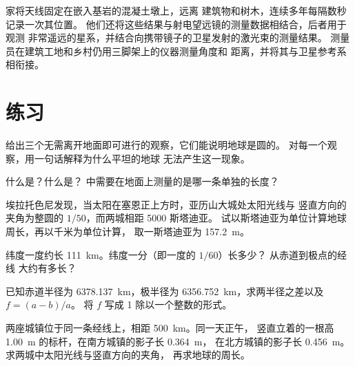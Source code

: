 \begin{inthefield}[今日的地面测量]
家将天线固定在嵌入基岩的混凝土墩上，远离
建筑物和树木，连续多年每隔数秒记录一次其位置。
他们还将这些结果与射电望远镜的测量数据相结合，后者用于观测
非常遥远的星系，并结合向携带镜子的卫星发射的激光束的测量结果。
测量员在建筑工地和乡村仍用三脚架上的仪器测量角度和
距离，并将其与卫星参考系相衔接。
\end{inthefield}

\section{练习}

\begin{exercise}[$\star$]\label{exo:g10:measuring-the-earth:1}
给出三个无需离开地面即可进行的观察，它们能说明地球是圆的。
对每一个观察，用一句话解释为什么平坦的地球
无法产生这一现象。
\end{exercise}

\begin{exercise}[$\star$]\label{exo:g10:measuring-the-earth:2}
什么是？什么是？
中需要在地面上测量的是哪一条单独的长度？
\end{exercise}

\begin{exercise}[$\star$]\label{exo:g10:measuring-the-earth:3}
埃拉托色尼发现，当太阳在塞恩正上方时，亚历山大城处太阳光线与
竖直方向的夹角为整圆的 $1/50$，而两城相距 5000 斯塔迪亚。
试以斯塔迪亚为单位计算地球周长，再以千米为单位计算，
取一斯塔迪亚为 \qty{157.2}{m}。
\end{exercise}

\begin{exercise}[$\star$]\label{exo:g10:measuring-the-earth:4}
纬度一度约长 \qty{111}{km}。纬度一分（即一度的 $1/60$）长多少？
从赤道到极点的经线
大约有多长？
\end{exercise}

\begin{exercise}[$\star$]\label{exo:g10:measuring-the-earth:5}
已知赤道半径为 \qty{6378.137}{km}，极半径为
\qty{6356.752}{km}，求两半径之差以及 $f = (a-b)/a$。
将 $f$ 写成 1 除以一个整数的形式。
\end{exercise}

\begin{exercise}[$\star\star$]\label{exo:g10:measuring-the-earth:6}
两座城镇位于同一条经线上，相距 \qty{500}{km}。同一天正午，
竖直立着的一根高 \qty{1.00}{m} 的标杆，在南方城镇的影子长 \qty{0.364}{m}，
在北方城镇的影子长 \qty{0.456}{m}。
求两城中太阳光线与竖直方向的夹角，
再求地球的周长。
\end{exercise}

